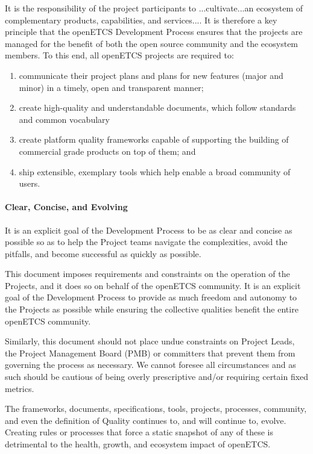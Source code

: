 \documentclass{template/openetcs_article}
\begin{document}
It is the responsibility of the project participants to ...cultivate...an ecosystem of complementary products, capabilities, and services.... It is therefore a key principle that the openETCS Development Process ensures that the projects are managed for the benefit of both the open source community and the ecosystem members. To this end, all openETCS projects are required to:

\begin{enumerate}
\item communicate their project plans and plans for new features (major and minor) in a timely, open and transparent manner;

\item create high-quality and understandable documents, which follow standards and common vocabulary 

\item create platform quality frameworks capable of supporting the building of commercial grade products on top of them; and

\item ship extensible, exemplary tools which help enable a broad community of users.
\end{enumerate}


\paragraph{Clear, Concise, and Evolving}
It is an explicit goal of the Development Process to be as clear and concise as possible so as to help the Project teams navigate the complexities, avoid the pitfalls, and become successful as quickly as possible.

This document imposes requirements and constraints on the operation of the Projects, and it does so on behalf of the openETCS community. It is an explicit goal of the Development Process to provide as much freedom and autonomy to the Projects as possible while ensuring the collective qualities benefit the entire openETCS community.

Similarly, this document should not place undue constraints on Project Leads, the Project Management Board (PMB) or committers that prevent them from governing the process as necessary. We cannot foresee all circumstances and as such should be cautious of being overly prescriptive and/or requiring certain fixed metrics.

The frameworks, documents, specifications, tools, projects, processes, community, and even the definition of Quality continues to, and will continue to, evolve. Creating rules or processes that force a static snapshot of any of these is detrimental to the health, growth, and ecosystem impact of openETCS.
\end{document}
